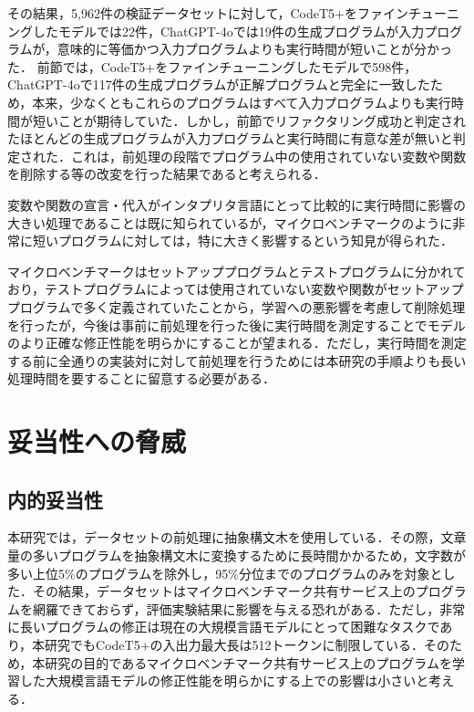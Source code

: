 \documentclass[submit,techrep,noauthor]{ipsj}
\begin{document}
その結果，5,962件の検証データセットに対して，CodeT5+をファインチューニングしたモデルでは22件，ChatGPT-4oでは19件の生成プログラムが入力プログラムが，意味的に等価かつ入力プログラムよりも実行時間が短いことが分かった．
前節では，CodeT5+をファインチューニングしたモデルで598件，ChatGPT-4oで117件の生成プログラムが正解プログラムと完全に一致したため，本来，少なくともこれらのプログラムはすべて入力プログラムよりも実行時間が短いことが期待していた．しかし，前節でリファクタリング成功と判定されたほとんどの生成プログラムが入力プログラムと実行時間に有意な差が無いと判定された．これは，前処理の段階でプログラム中の使用されていない変数や関数を削除する等の改変を行った結果であると考えられる．

変数や関数の宣言・代入がインタプリタ言語にとって比較的に実行時間に影響の大きい処理であることは既に知られている\cite{Gong_2015}が，マイクロベンチマークのように非常に短いプログラムに対しては，特に大きく影響するという知見が得られた．

マイクロベンチマークはセットアッププログラムとテストプログラムに分かれており，テストプログラムによっては使用されていない変数や関数がセットアッププログラムで多く定義されていたことから，学習への悪影響を考慮して削除処理を行ったが，今後は事前に前処理を行った後に実行時間を測定することでモデルのより正確な修正性能を明らかにすることが望まれる．ただし，実行時間を測定する前に全通りの実装対に対して前処理を行うためには本研究の手順よりも長い処理時間を要することに留意する必要がある．



\section{妥当性への脅威}\label{sec:threats}

\subsection{内的妥当性}
本研究では，データセットの前処理に抽象構文木を使用している．その際，文章量の多いプログラムを抽象構文木に変換するために長時間かかるため，文字数が多い上位5\%のプログラムを除外し，95\%分位までのプログラムのみを対象とした．その結果，データセットはマイクロベンチマーク共有サービス上のプログラムを網羅できておらず，評価実験結果に影響を与える恐れがある．ただし，非常に長いプログラムの修正は現在の大規模言語モデルにとって困難なタスクであり，本研究でもCodeT5+の入出力最大長は512トークンに制限している．そのため，本研究の目的であるマイクロベンチマーク共有サービス上のプログラムを学習した大規模言語モデルの修正性能を明らかにする上での影響は小さいと考える．
\end{document}

